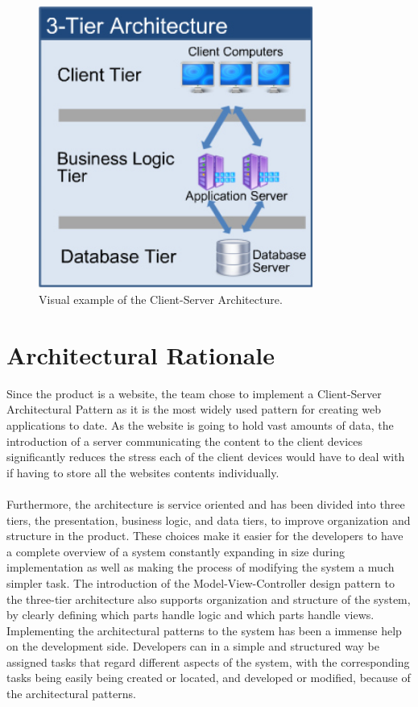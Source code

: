 \begin{figure}
\centering
\includegraphics[width=90mm]{./Architecture/img/threetier.jpg}
\caption{Visual example of the Client-Server Architecture. \label{overflow}}
\end{figure}


\section{Architectural Rationale}
\label{sec:ArchRationale}
Since the product is a website, the team chose to implement a Client-Server Architectural Pattern as it is the most widely used pattern for creating web applications to date. As the website is going to hold vast amounts of data, the introduction of a server communicating the content to the client devices significantly reduces the stress each of the client devices would have to deal with if having to store all the websites contents individually. 

\paragraph{} Furthermore, the architecture is service oriented and has been divided into three tiers, the presentation, business logic, and data tiers, to improve organization and structure in the product. These choices make it easier for the developers to have a complete overview of a system constantly expanding in size during implementation as well as making the process of modifying the system a much simpler task. The introduction of the Model-View-Controller design pattern to the three-tier architecture also supports organization and structure of the system, by clearly defining which parts handle logic and which parts handle views. Implementing the architectural patterns to the system has been a immense help on the development side. Developers can in a simple and structured way be assigned tasks that regard different aspects of the system, with the corresponding tasks being easily being created or located, and developed or modified, because of the architectural patterns. 
